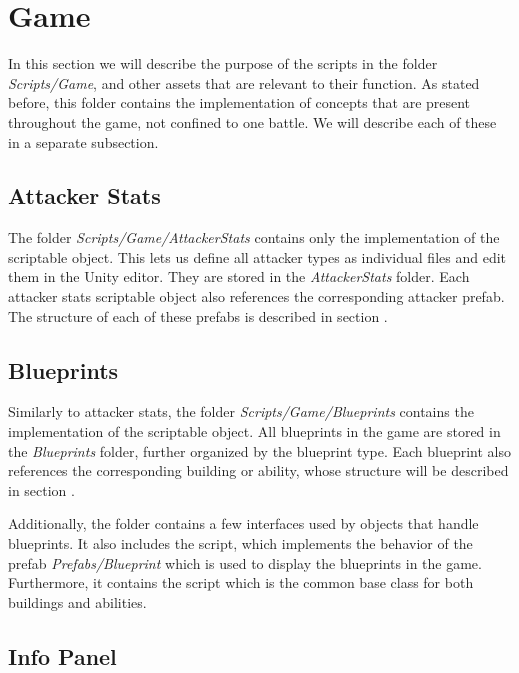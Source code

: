 \section{Game}\label{sec:docs-game}

In this section we will describe the purpose of the scripts in the folder \emph{Scripts/Game}, and other assets that are relevant to their function.
As stated before, this folder contains the implementation of concepts that are present throughout the game, not confined to one battle.
We will describe each of these in a separate subsection.

\subsection{Attacker Stats}

The folder \emph{Scripts/Game/AttackerStats} contains only the implementation of the  scriptable object.
This lets us define all attacker types as individual files and edit them in the Unity editor.
They are stored in the \emph{AttackerStats} folder.
Each attacker stats scriptable object also references the corresponding attacker prefab.
The structure of each of these prefabs is described in section .

\subsection{Blueprints}

Similarly to attacker stats, the folder \emph{Scripts/Game/Blueprints} contains the implementation of the  scriptable object.
All blueprints in the game are stored in the \emph{Blueprints} folder, further organized by the blueprint type.
Each blueprint also references the corresponding building or ability, whose structure will be described in section .

Additionally, the folder contains a few interfaces used by objects that handle blueprints.
It also includes the  script, which implements the behavior of the prefab \emph{Prefabs/Blueprint} which is used to display the blueprints in the game.
Furthermore, it contains the script  which is the common base class for both buildings and abilities.

\subsection{Info Panel}

